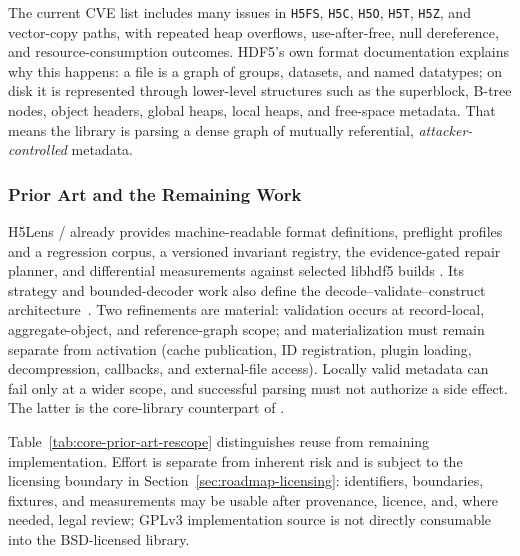 \documentclass[../main.tex]{subfiles}
\begin{document}
The current CVE list includes many issues in \texttt{H5FS},
\texttt{H5C}, \texttt{H5O}, \texttt{H5T}, \texttt{H5Z}, and
vector-copy paths, with repeated heap overflows, use-after-free,
null dereference, and resource-consumption outcomes.
HDF5’s own format documentation explains why this happens: a file is a
graph of groups, datasets, and named datatypes; on disk it is
represented through lower-level structures such as the superblock,
B-tree nodes, object headers, global heaps, local heaps, and
free-space metadata. That means the library is parsing a dense graph
of mutually referential, \textit{attacker-controlled} metadata.

\subsubsection{Prior Art and the Remaining Work}
\label{sec:core-prior-art}

H5Lens /  already provides machine-readable format
definitions,  preflight profiles and a regression corpus, a
versioned invariant registry, the evidence-gated  repair planner,
and differential measurements against selected libhdf5 builds
\cite{h5lens,h5policy,h5policy-invariant-registry,h5patch}. Its strategy
and bounded-decoder work also define the decode--validate--construct
architecture~\cite{hdf5-cve-strategy,hdf5-bounded-raw-decode}. Two refinements
are material: validation occurs at record-local, aggregate-object, and
reference-graph scope; and materialization must remain separate from activation
(cache publication, ID registration, plugin loading, decompression, callbacks,
and external-file access). Locally valid metadata can fail only at a wider
scope, and successful parsing must not authorize a side effect. The latter is
the core-library counterpart of .

Table~\ref{tab:core-prior-art-rescope} distinguishes reuse from remaining
implementation. Effort is separate from inherent risk and is subject to the
licensing boundary in Section~\ref{sec:roadmap-licensing}: identifiers,
boundaries, fixtures, and measurements may be usable after provenance, licence,
and, where needed, legal review; GPLv3 implementation source is not directly
consumable into the BSD-licensed library.
\end{document}
